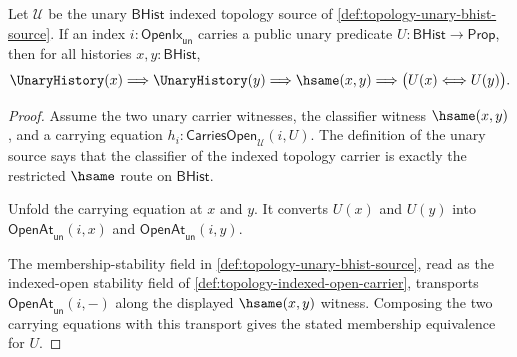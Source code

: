 \begin{theorem}
\label{thm:topology-unary-membership-transport-obligation}
Let $\mathcal{U}$ be the unary $\mathsf{BHist}$ indexed topology source of \autoref{def:topology-unary-bhist-source}. If an index $i:\mathsf{OpenIx}_{\mathsf{un}}$ carries a public unary predicate $U:\mathsf{BHist}\to\mathsf{Prop}$, then for all histories $x,y:\mathsf{BHist}$,
$$
\UnaryHistory(x)
\Longrightarrow
\UnaryHistory(y)
\Longrightarrow
\hsame(x,y)
\Longrightarrow
\bigl(U(x)\Longleftrightarrow U(y)\bigr).
$$
\end{theorem}
\begin{proof}
Assume the two unary carrier witnesses, the classifier witness $\hsame(x,y)$, and a carrying equation $h_i:\mathsf{CarriesOpen}_{\mathcal{U}}(i,U)$. The definition of the unary source says that the classifier of the indexed topology carrier is exactly the restricted $\hsame$ route on $\mathsf{BHist}$.

Unfold the carrying equation at $x$ and $y$. It converts $U(x)$ and $U(y)$ into $\mathsf{OpenAt}_{\mathsf{un}}(i,x)$ and $\mathsf{OpenAt}_{\mathsf{un}}(i,y)$.

The membership-stability field in \autoref{def:topology-unary-bhist-source}, read as the indexed-open stability field of \autoref{def:topology-indexed-open-carrier}, transports $\mathsf{OpenAt}_{\mathsf{un}}(i,-)$ along the displayed $\hsame(x,y)$ witness. Composing the two carrying equations with this transport gives the stated membership equivalence for $U$.
\end{proof}

